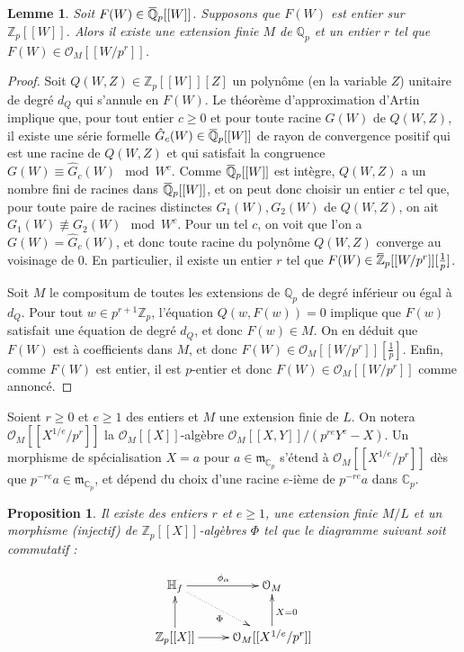 \documentclass[12pt]{amsart}
\newcommand\bC{\mathbb{C}}
\newcommand\bZ{\mathbb{Z}}
\newcommand\bQ{\mathbb{Q}}
\newcommand\bH{\mathbb{H}}
\newcommand\Zp{{\mathbb{Z}_{p}}}
\newcommand\Qp{\mathbb{Q}_{p}}
\newcommand\cO{\mathcal{O}}
\newcommand\gm{\mathfrak{m}}
\newcommand{\ob}[1]{\mkern 1.5mu\overline{\mkern-1.5mu#1\mkern-1.5mu}\mkern 1.5mu}
\theoremstyle{defstyle}
\theoremstyle{thmstyle}
\newtheorem{proposition}[subsubsection]{Proposition}
\newtheorem{lemme}[subsubsection]{Lemme}
\begin{document}
\begin{lemme}\label{artin_approx}
	Soit $F(W) \in \ob{\bQ}_p[[W]]$. Supposons que $F(W)$ est entier sur $\Zp[[W]]$. Alors il existe une extension finie $M$ de $\Qp$ et un entier $r$ tel que $F(W) \in \cO_M[[W/p^r]]$.
\end{lemme}
\begin{proof}
	Soit $Q(W,Z)\in \Zp[[W]][Z]$ un polynôme (en la variable $Z$) unitaire de degré $d_Q$ qui s'annule en $F(W)$. Le théorème d'approximation d'Artin \cite[Theorem 1.2]{artin1968solutions} implique que, pour tout entier $c\geq 0$ et pour toute racine $G(W)$ de $Q(W,Z)$, il existe une série formelle $\hat{G}_c(W) \in \ob{\bQ}_p[[W]]$ de rayon de convergence positif qui est une racine de $Q(W,Z)$ et qui satisfait la congruence $G(W) \equiv \hat{G}_c(W) \mod W^c$. Comme $\ob{\bQ}_p[[W]]$ est intègre, $Q(W,Z)$ a un nombre fini de racines dans $\ob{\bQ}_p[[W]]$, et on peut donc choisir un entier $c$ tel que, pour toute paire de racines distinctes $G_1(W),G_2(W)$ de $Q(W,Z)$, on ait $G_1(W)\not\equiv G_2(W) \mod W^c$. Pour un tel $c$, on voit que l'on a $G(W) = \hat{G}_c(W)$, et donc toute racine du polynôme $Q(W,Z)$ converge au voisinage de $0$. En particulier, il existe un entier $r$ tel que $F(W) \in \ob{\bZ}_p[[W/p^r]][\tfrac{1}{p}]$. 
	
	Soit $M$ le compositum de toutes les extensions de $\Qp$ de degré inférieur ou égal à $d_Q$. Pour tout $w\in p^{r+1}\Zp$, l'équation $Q(w,F(w))=0$ implique que $F(w)$ satisfait une équation de degré $d_Q$, et donc $F(w) \in M$. On en déduit que $F(W)$ est à coefficients dans $M$, et donc $F(W) \in \cO_M[[W/p^r]][\tfrac{1}{p}]$. Enfin, comme $F(W)$ est entier, il est $p$-entier et donc $F(W) \in \cO_M[[W/p^r]]$ comme annoncé.
\end{proof}

Soient $r\geq 0$ et $e\geq 1$ des entiers et $M$ une extension finie de $L$. On notera $\cO_M[[X^{1/e}/p^r]]$ la $\cO_M[[X]]$-algèbre $\cO_M[[X,Y]]/(p^{re}Y^e-X)$. Un morphisme de spécialisation $X=a$ pour $a\in \gm_{\bC_p}$ s'étend à $\cO_M[[X^{1/e}/p^r]]$ dès que $p^{-re}a\in \gm_{\bC_p}$, et dépend du choix d'une racine $e$-ième de $p^{-re}a$ dans $\bC_p$.

\begin{proposition}\label{phi_infty}
	Il existe des entiers $r$ et $e\geq 1$, une extension finie $M/L$ et un morphisme (injectif) de $\Zp[[X]]$-algèbres $\Phi$ tel que le diagramme suivant soit commutatif :
	
	\begin{equation}\label{diagramme_phi_infty}
	\xymatrix{
		\bH_\textbf{f} \ar[r]^{\phi_{\alpha}} \ar@{.>}[rd]_{\Phi} & \cO_M \\
		\Zp[[X]] \ar[u] \ar[r] & \cO_M[[X^{1/e}/p^r]] \ar[u]_{X=0} 
	}
	\end{equation}
	
\end{proposition}
\end{document}
